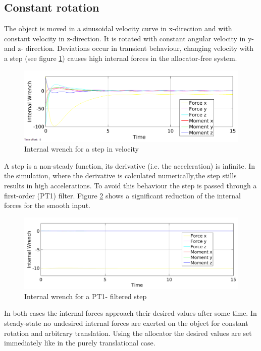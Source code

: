 \documentclass[conference]{IEEEtran}
\begin{document}
\subsection{Constant rotation}  
The object is moved in a sinusoidal velocity curve in x-direction and with constant velocity in z-direction. It is rotated with constant angular velocity in y- and z- direction. Deviations occur in transient behaviour, changing velocity with a step (see figure \ref{IntForceStep}) causes high internal forces in the allocator-free system.
\begin{figure}
\includegraphics[width=\linewidth]{IntForceStep2}
\caption{Internal wrench for a step in velocity}
\label{IntForceStep}
\end{figure}
 A step is a non-steady function, its derivative (i.e. the acceleration) is infinite. In the simulation, where the derivative is calculated numerically,the step stills results in high accelerations. To avoid this behaviour the step is passed through a first-order (PT1) filter. Figure \ref{IntForcePT1} shows a significant reduction of the internal forces for the smooth input. 
\begin{figure}
\includegraphics[width=\linewidth]{IntForcePT1}
\caption{Internal wrench for a PT1- filtered step}
\label{IntForcePT1}
\end{figure}
In both cases the internal forces approach their desired values after some time. In steady-state no undesired internal forces are exerted on the object for constant rotation and arbitrary translation. Using the allocator the desired values are set immediately like in the purely translational case.\\
\end{document}
